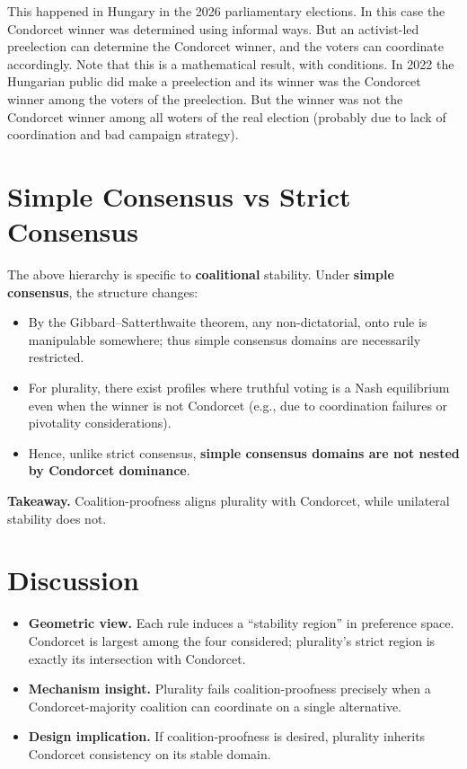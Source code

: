 \documentclass{article}
\begin{document}
This happened in Hungary in the 2026 parliamentary elections. In this case the Condorcet winner was determined using informal ways. But an activist-led preelection can determine the Condorcet winner, and the voters can coordinate accordingly. Note that this is a mathematical result, with conditions. In 2022 the Hungarian public did make a preelection and its winner was the Condorcet winner among the voters of the preelection. But the winner was not the Condorcet winner among all woters of the real election (probably due to lack of coordination and bad campaign strategy).

\section{Simple Consensus vs Strict Consensus}
The above hierarchy is specific to \textbf{coalitional} stability. Under \textbf{simple consensus}, the structure changes:
\begin{itemize}
    \item By the Gibbard–Satterthwaite theorem, any non-dictatorial, onto rule is manipulable somewhere; thus simple consensus domains are necessarily restricted.
    \item For plurality, there exist profiles where truthful voting is a Nash equilibrium even when the winner is not Condorcet (e.g., due to coordination failures or pivotality considerations).
    \item Hence, unlike strict consensus, \textbf{simple consensus domains are not nested by Condorcet dominance}.
\end{itemize}
\textbf{Takeaway.} Coalition-proofness aligns plurality with Condorcet, while unilateral stability does not.


\section{Discussion}
\begin{itemize}
    \item \textbf{Geometric view.} Each rule induces a “stability region” in preference space. Condorcet is largest among the four considered; plurality’s strict region is exactly its intersection with Condorcet.
    \item \textbf{Mechanism insight.} Plurality fails coalition-proofness precisely when a Condorcet-majority coalition can coordinate on a single alternative.
    \item \textbf{Design implication.} If coalition-proofness is desired, plurality inherits Condorcet consistency on its stable domain.
\end{itemize}
\end{document}

